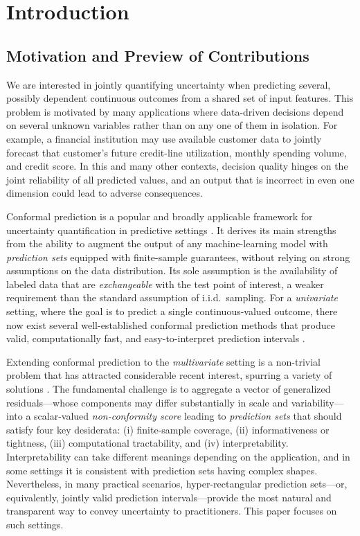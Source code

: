 \section{Introduction}
\label{sec:intro}

\subsection{Motivation and Preview of Contributions}
\label{sec:intro-motivation} 

We are interested in jointly quantifying uncertainty when predicting several, possibly dependent continuous outcomes from a shared set of input features. 
This problem is motivated by many applications where data-driven decisions depend on several unknown variables rather than on any one of them in isolation. For example, a financial institution may use available customer data to jointly forecast that customer's future credit-line utilization, monthly spending volume, and credit score. In this and many other contexts, decision quality hinges on the joint reliability of all predicted values, and an output that is incorrect in even one dimension could lead to adverse consequences.

Conformal prediction is a popular and broadly applicable framework for uncertainty quantification in predictive settings \citep{vovk2005algorithmic, angelopoulos2023conformal}. It derives its main strengths from the ability to augment the output of any machine-learning model with {\em prediction sets} equipped with finite-sample guarantees, without relying on strong assumptions on the data distribution. Its sole assumption is the availability of labeled data that are {\em exchangeable} with the test point of interest, a weaker requirement than the standard assumption of i.i.d.~sampling. For a {\em univariate} setting, where the goal is to predict a single continuous-valued outcome, there now exist several well-established conformal prediction methods that produce valid, computationally fast, and easy-to-interpret prediction intervals \citep{lei2018distribution, romano2019conformalized, sesia2021conformal}.

Extending conformal prediction to the {\em multivariate} setting is a non-trivial problem that has attracted considerable recent interest, spurring a variety of solutions \citep{dheur2025unified}. The fundamental challenge is to aggregate a vector of generalized residuals—whose components may differ substantially in scale and variability—into a scalar-valued {\em non-conformity score} leading to {\em prediction sets} that should satisfy four key desiderata: (i) finite-sample coverage, (ii) informativeness or tightness, (iii) computational tractability, and (iv) interpretability.
Interpretability can take different meanings depending on the application, and in some settings it is consistent with prediction sets having complex shapes. Nevertheless, in many practical scenarios, hyper-rectangular prediction sets—or, equivalently, jointly valid prediction intervals—provide the most natural and transparent way to convey uncertainty to practitioners. This paper focuses on such settings.

